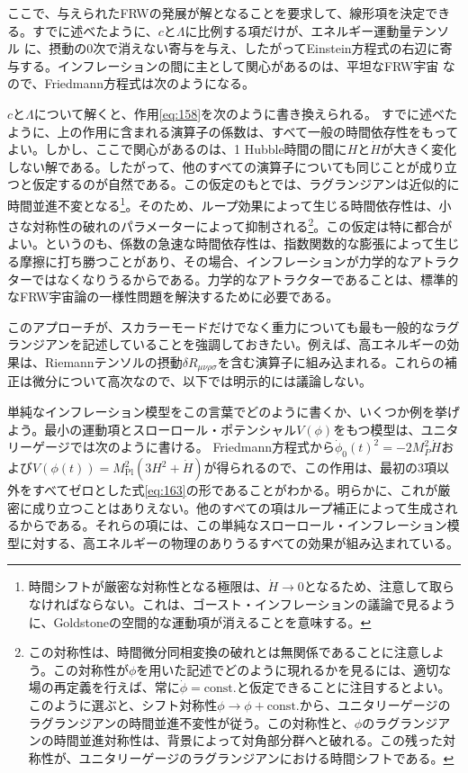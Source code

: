 ここで、与えられたFRWの発展が解となることを要求して、線形項を決定できる。すでに述べたように、$c$と$\Lambda$に比例する項だけが、エネルギー運動量テンソル
に、摂動の0次で消えない寄与を与え、したがってEinstein方程式の右辺に寄与する。インフレーションの間に主として関心があるのは、平坦なFRW宇宙
なので、Friedmann方程式は次のようになる。

$c$と$\Lambda$について解くと、作用\eqref{eq:158}を次のように書き換えられる。
すでに述べたように、上の作用に含まれる演算子の係数は、すべて一般の時間依存性をもってよい。しかし、ここで関心があるのは、1 Hubble時間の間に$H$と$\dot H$が大きく変化しない解である。したがって、他のすべての演算子についても同じことが成り立つと仮定するのが自然である。この仮定のもとでは、ラグランジアンは近似的に時間並進不変となる\footnote[10]{時間シフトが厳密な対称性となる極限は、$\dot H\to0$となるため、注意して取らなければならない。これは、ゴースト・インフレーションの議論で見るように、Goldstoneの空間的な運動項が消えることを意味する。}。そのため、ループ効果によって生じる時間依存性は、小さな対称性の破れのパラメーターによって抑制される\footnote[11]{この対称性は、時間微分同相変換の破れとは無関係であることに注意しよう。この対称性が$\phi$を用いた記述でどのように現れるかを見るには、適切な場の再定義を行えば、常に$\dot\phi=\mathrm{const.}$と仮定できることに注目するとよい。このように選ぶと、シフト対称性$\phi\to\phi+\mathrm{const.}$から、ユニタリーゲージのラグランジアンの時間並進不変性が従う。この対称性と、$\phi$のラグランジアンの時間並進対称性は、背景によって対角部分群へと破れる。この残った対称性が、ユニタリーゲージのラグランジアンにおける時間シフトである。}。この仮定は特に都合がよい。というのも、係数の急速な時間依存性は、指数関数的な膨張によって生じる摩擦に打ち勝つことがあり、その場合、インフレーションが力学的なアトラクターではなくなりうるからである。力学的なアトラクターであることは、標準的なFRW宇宙論の一様性問題を解決するために必要である。

このアプローチが、スカラーモードだけでなく重力についても最も一般的なラグランジアンを記述していることを強調しておきたい。例えば、高エネルギーの効果は、Riemannテンソルの摂動$\delta R_{\mu\nu\rho\sigma}$を含む演算子に組み込まれる。これらの補正は微分について高次なので、以下では明示的には議論しない。

単純なインフレーション模型をこの言葉でどのように書くか、いくつか例を挙げよう。最小の運動項とスローロール・ポテンシャル$V(\phi)$をもつ模型は、ユニタリーゲージでは次のように書ける。
Friedmann方程式から$\dot\phi_0(t)^2=-2M_P^2\dot H$および$V(\phi(t))=M_{\mathrm{Pl}}^2(3H^2+\dot H)$が得られるので、この作用は、最初の3項以外をすべてゼロとした式\eqref{eq:163}の形であることがわかる。明らかに、これが厳密に成り立つことはありえない。他のすべての項はループ補正によって生成されるからである。それらの項には、この単純なスローロール・インフレーション模型に対する、高エネルギーの物理のありうるすべての効果が組み込まれている。


